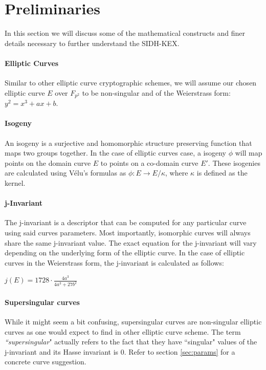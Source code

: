 \documentclass[10pt,twocolumn]{article} %
\begin{document}
\section{Preliminaries}

In this section we will discuss some of the mathematical constructs and finer details necessary to further understand the SIDH-KEX.

\paragraph{Elliptic Curves}
Similar to other elliptic curve cryptographic schemes, we will assume our chosen elliptic curve $E$ over $F_{p^2}$ to be non-singular and of the Weierstrass form: $y^2 = x^3 + ax + b$.

\paragraph{Isogeny} An isogeny is a surjective and homomorphic structure preserving function that maps two groups together. In the case of elliptic curves case, a  isogeny $\phi$ will map points on the domain curve $E$ to points on a co-domain curve $E'$. These isogenies are calculated using V{\'e}lu's formulas \cite{velu1971isogenies} as $\phi: E \rightarrow E/\kappa$, where $\kappa$ is defined as the kernel.

\paragraph{j-Invariant}
The j-invariant is a descriptor that can be computed for any particular curve using said curves parameters. Most importantly, isomorphic curves will always share the same j-invariant value. The exact equation for the j-invariant will vary depending on the underlying form of the elliptic curve. In the case of elliptic curves in the Weierstrass form, the j-invariant is calculated as follows:

\begin{center}
	\centering
	$j(E)=1728\cdot\frac{4a^3}{4a^3+27b^2}$
\end{center}




\paragraph{Supersingular curves} While it might seem a bit confusing, supersingular curves are non-singular elliptic curves as one would expect to find in other elliptic curve scheme. The term \textit{``supersingular}" actually refers to the fact that they have ``singular" values of the j-invariant and its Hasse invariant is 0. Refer to section \ref{sec:params} for a concrete curve suggestion.
\end{document}
